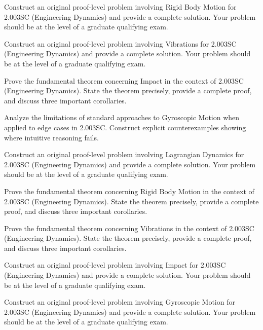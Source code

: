 \documentclass[12pt,a4paper]{exam}
\begin{document}
\begin{questions}
\vspace{0.3cm}

\question[7]
Construct an original proof-level problem involving Rigid Body Motion for 2.003SC (Engineering Dynamics) and provide a complete solution. Your problem should be at the level of a graduate qualifying exam.

\vspace{0.3cm}

\question[5]
Construct an original proof-level problem involving Vibrations for 2.003SC (Engineering Dynamics) and provide a complete solution. Your problem should be at the level of a graduate qualifying exam.

\vspace{0.3cm}

\question[3]
Prove the fundamental theorem concerning Impact in the context of 2.003SC (Engineering Dynamics). State the theorem precisely, provide a complete proof, and discuss three important corollaries.

\vspace{0.3cm}

\question[4]
Analyze the limitations of standard approaches to Gyroscopic Motion when applied to edge cases in 2.003SC. Construct explicit counterexamples showing where intuitive reasoning fails.

\vspace{0.3cm}

\question[5]
Construct an original proof-level problem involving Lagrangian Dynamics for 2.003SC (Engineering Dynamics) and provide a complete solution. Your problem should be at the level of a graduate qualifying exam.

\vspace{0.3cm}

\question[5]
Prove the fundamental theorem concerning Rigid Body Motion in the context of 2.003SC (Engineering Dynamics). State the theorem precisely, provide a complete proof, and discuss three important corollaries.

\vspace{0.3cm}

\question[2]
Prove the fundamental theorem concerning Vibrations in the context of 2.003SC (Engineering Dynamics). State the theorem precisely, provide a complete proof, and discuss three important corollaries.

\vspace{0.3cm}

\question[4]
Construct an original proof-level problem involving Impact for 2.003SC (Engineering Dynamics) and provide a complete solution. Your problem should be at the level of a graduate qualifying exam.

\vspace{0.3cm}

\question[5]
Construct an original proof-level problem involving Gyroscopic Motion for 2.003SC (Engineering Dynamics) and provide a complete solution. Your problem should be at the level of a graduate qualifying exam.

\vspace{0.3cm}

\end{questions}
\end{document}
